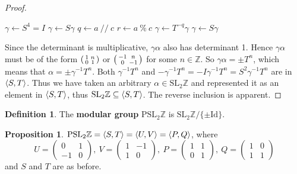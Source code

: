 \documentclass[12pt,twoside]{reedthesis}
\theoremstyle{definition}
\newtheorem{defn}[thm]{Definition}
\newtheorem{prop}[thm]{Proposition}
\newcommand{\Z}{\mathbb{Z}}
\newcommand{\SLZ}{\mathrm{SL}_2{\Z}}
\newcommand{\PSLZ}{\mathrm{PSL}_2{\Z}}
\newcommand{\Id}{\mathrm{Id}}
\newcommand{\defnphrase}[1]{\textbf{#1}}
\DeclarePairedDelimiter\ang{\langle}{\rangle}
\begin{document}
\begin{proof}
  \vspace{1em}
  \begin{algorithmic}
    \State $\gamma \gets S^4 = I$
      $\gamma \gets S \gamma$
    \EndIf
      \State $q \gets a \ // \ c$
      \State $r \gets a\ \% \ c$
      \State $\gamma \gets T^{-q} \gamma$
        $\gamma \gets S \gamma$
      \EndIf
    \EndWhile
  \end{algorithmic}

  Since the determinant is multiplicative, $\gamma \alpha$ also has determinant 1.
  Hence $\gamma\alpha$ must be of the form $\begin{psmallmatrix}1 & n \\ 0 & 1\end{psmallmatrix}$ or $\begin{psmallmatrix}-1 & n \\ 0 & -1\end{psmallmatrix}$ for some $n \in \Z$.
  So $\gamma \alpha = \pm T^n$, which means that $\alpha = \pm \gamma^{-1} T^n$.
  Both $\gamma^{-1} T^n$ and $-\gamma^{-1} T^n = -I \gamma^{-1} T^n = S^2 \gamma^{-1} T^n$ are in $\ang{S,T}$.
  Thus we have taken an arbitrary $\alpha \in \SLZ$ and represented it as an element in $\ang{S,T}$, thus $\SLZ \subseteq \ang{S,T}$.
  The reverse inclusion is apparent.
\end{proof}

\begin{defn}
  The \defnphrase{modular group} $\PSLZ$ is $\SLZ / \{ \pm \Id \}$.
\end{defn}

\begin{prop}\label{prop:pslgenerators}
  $\PSLZ = \ang{S, T} = \ang{U,V} = \ang{P,Q}$, where
  \begin{equation*}
    U = \begin{pmatrix}
      0 & 1 \\
      -1 & 0
    \end{pmatrix},\
    V = \begin{pmatrix}
      1 & -1 \\
      1 & 0
    \end{pmatrix},\
    P = \begin{pmatrix}
      1 & 1 \\
      0 & 1
    \end{pmatrix},\
    Q = \begin{pmatrix}
      1 & 0 \\
      1 & 1
    \end{pmatrix}
  \end{equation*}
  and $S$ and $T$ are as before.
\end{prop}
\end{document}
